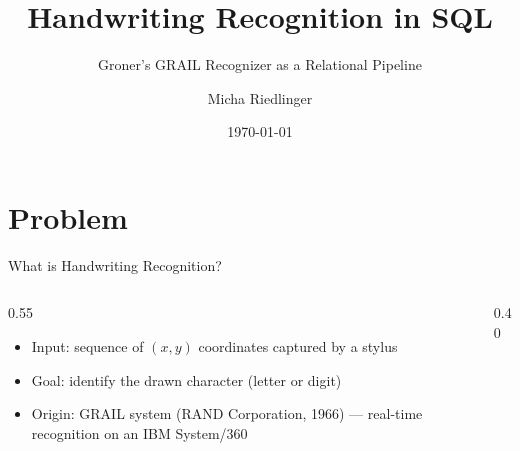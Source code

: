 \documentclass[aspectratio=169, 12pt]{beamer}
\title{Handwriting Recognition in SQL}
\subtitle{Groner's GRAIL Recognizer as a Relational Pipeline}
\author{Micha Riedlinger}
\institute{University of Tübingen\\
           Seminar: \href{https://db.cs.uni-tuebingen.de/teaching/ss26/sql-is-a-programming-language/}{\textit{SQL is a Programming Language}}}
\date{\today}
\begin{document}
\maketitle

\section{Problem}

\begin{frame}{What is Handwriting Recognition?}
  \begin{columns}[T]
    \begin{column}{0.55\textwidth}
      \begin{itemize}
        \item Input: sequence of $(x, y)$ coordinates captured by a stylus
        \item Goal: identify the drawn character (letter or digit)
        \item Origin: GRAIL system (RAND Corporation, 1966) — real-time recognition on an IBM System/360
      \end{itemize}
    \end{column}
    \begin{column}{0.40\textwidth}
    \end{column}
  \end{columns}
\end{frame}
\end{document}
